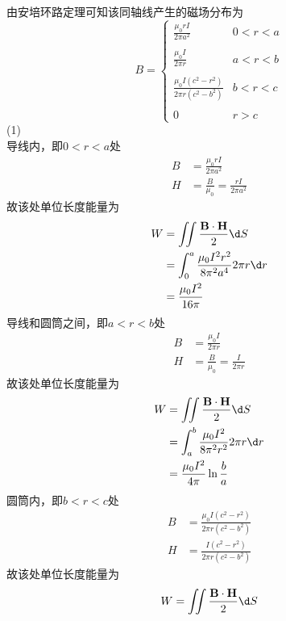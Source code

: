 \documentclass{phyasgn}
\begin{document}
\begin{sol}[4-68]
    由安培环路定理可知该同轴线产生的磁场分布为
    $$B=\left\{\begin{matrix}
        \frac{\mu_0rI}{2\pi a^2}  &0<r<a \\
        \\
         \frac{\mu_0I}{2\pi r} &a<r<b \\
         \\
         \frac{\mu_0I(c^2-r^2)}{2\pi r(c^2-b^2)} &b<r<c \\
         \\
         0&r>c
       \end{matrix}\right.$$
       (1)\\
       导线内，即$0<r<a$处
       $$\begin{aligned}
        B&=\frac{\mu_0rI}{2\pi a^2}\\
        H&=\frac{B}{\mu_0}=\frac{rI}{2\pi a^2}
       \end{aligned}$$
       故该处单位长度能量为
       $$\begin{aligned}
        W&=\iint\frac{\mathbf{B}\cdot \mathbf{H}}{2}\d S\\
        &=\int_0^a\frac{\mu_0I^2r^2}{8\pi^2a^4}2\pi r\d r\\
        &=\frac{\mu_0I^2}{16\pi}
       \end{aligned}$$
       导线和圆筒之间，即$a<r<b$处
       $$\begin{aligned}
        B&=\frac{\mu_0I}{2\pi r}\\
        H&=\frac{B}{\mu_0}=\frac{I}{2\pi r}
       \end{aligned}$$
       故该处单位长度能量为
       $$\begin{aligned}
        W&=\iint\frac{\mathbf{B}\cdot \mathbf{H}}{2}\d S\\
        &=\int_a^b\frac{\mu_0I^2}{8\pi^2r^2}2\pi r\d r\\
        &=\frac{\mu_0I^2}{4\pi}\ln\frac{b}{a}       
       \end{aligned}$$
       圆筒内，即$b<r<c$处
       $$\begin{aligned}
        B&=\frac{\mu_0I(c^2-r^2)}{2\pi r(c^2-b^2)}\\
        H&=\frac{I(c^2-r^2)}{2\pi r(c^2-b^2)}
       \end{aligned}$$
       故该处单位长度能量为
       $$\begin{aligned}
        W&=\iint\frac{\mathbf{B}\cdot \mathbf{H}}{2}\d S\\

\end{aligned}$$
\end{sol}
\end{document}
